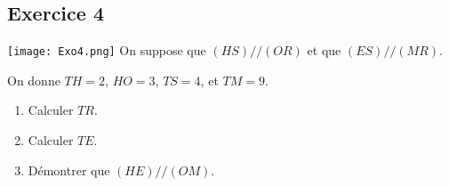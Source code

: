 \documentclass[14 pt]{extarticle}
\theoremstyle{plain}
\begin{document}
 
 \subsection*{Exercice 4}
 
 \texttt{[image: Exo4.png]}\newline
 On suppose que $(HS)//(OR)$ et que $(ES)//(MR)$. 
 
 On donne $TH = 2$, $HO = 3$, $TS= 4$, et $TM= 9$. 
 
 \begin{enumerate}
 \item Calculer $TR$. 
 \item Calculer $TE$.  
 \item Démontrer que $(HE)//(OM)$. 
 \end{enumerate}
 

 	
\end{document}
